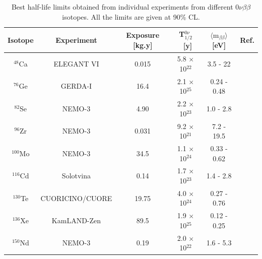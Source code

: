 \documentclass[main.tex]{subfiles}
\begin{document}
\begin{table}[h!]
\centering
\begin{tabular}{cccccc}
\toprule
Isotope & Experiment & Exposure [kg.y]& T$_{\text{1/2}}^{\text{0}\nu}$~[y] & $\langle \text{m}_{\beta\beta} \rangle$ [eV]&  Ref. \\
\midrule
$^{\text{48}}$Ca  & ELEGANT VI       & 0.015 & 5.8 $\times$ 10$^{\text{22}}$ & 3.5 - 22    & \cite{ELEGANTVI}       \\[0.1cm]
$^{\text{76}}$Ge  & GERDA-I          & 16.4  & 2.1 $\times$ 10$^{\text{25}}$ & 0.24 - 0.48 & \cite{GERDA}           \\[0.1cm]
$^{\text{82}}$Se  & NEMO-3           & 4.90  & 2.2 $\times$ 10$^{\text{23}}$ & 1.0 - 2.8   & \cite{ThesisJMott}     \\[0.1cm]
$^{\text{96}}$Zr  & NEMO-3           & 0.031 & 9.2 $\times$ 10$^{\text{21}}$ & 7.2 - 19.5  & \cite{NEMO3:Zr96}      \\[0.1cm]
$^{\text{100}}$Mo & NEMO-3           & 34.5  & 1.1 $\times$ 10$^{\text{24}}$ & 0.33 - 0.62 & \cite{NEMO3:Mo100}     \\[0.1cm]
$^{\text{116}}$Cd & Solotvina        & 0.14  & 1.7 $\times$ 10$^{\text{23}}$ & 1.4 - 2.8   & \cite{Solotvina}       \\[0.1cm]
$^{\text{130}}$Te & CUORICINO/CUORE  & 19.75 & 4.0 $\times$ 10$^{\text{24}}$ & 0.27 - 0.76 & \cite{CUORE-TeResults} \\[0.1cm]
$^{\text{136}}$Xe & KamLAND-Zen      & 89.5  & 1.9 $\times$ 10$^{\text{25}}$ & 0.12 - 0.25 & \cite{KamLAND-Zen}     \\[0.1cm]
$^{\text{150}}$Nd & NEMO-3           & 0.19  & 2.0 $\times$ 10$^{\text{22}}$ & 1.6 - 5.3   & \cite{NEMO3:Nd150}     \\
\bottomrule
\end{tabular}
\caption{Best half-life limits obtained from individual experiments from different 0$\nu\beta\beta$ isotopes. All the limits are given at 90\% CL.}
\label{tab:summaryBB0NUmeasurements}
\end{table}
\end{document}

